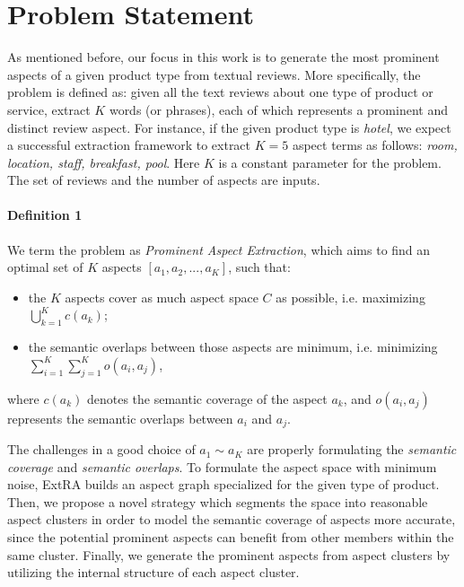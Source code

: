 \section{Problem Statement}
\label{sec:problem}
As mentioned before, our focus in this work is to
generate the most prominent aspects of a given product type
from textual reviews.
More specifically, the problem is defined as:
given all the text reviews about
one type of product or service, extract $K$ words (or phrases),
each of which represents a prominent and distinct review aspect.
For instance, if the given product type is \textit{hotel}, 
we expect a successful extraction framework to extract 
$K=5$ aspect terms as follows: 
\textit{room, location, staff, breakfast, pool}.
Here $K$ is a constant parameter for the problem. 
The set of reviews and the number of aspects are inputs.


\paragraph{Definition 1}
We term the problem as \textit{Prominent Aspect Extraction},
which aims to find 
an optimal set of $K$ aspects $[a_1, a_2, ..., a_K]$, such that:
\begin{itemize}
	\item  the $K$ aspects cover as much aspect space $C$ as possible,
	i.e. maximizing $\bigcup_{k=1}^K c(a_k)$;
	\item the semantic overlaps between those aspects are minimum, 
	i.e. minimizing $\sum_{i=1}^{K}\sum_{j=1}^{K}o(a_i, a_j)$,
\end{itemize}
where $c(a_k)$ denotes the semantic coverage of the aspect $a_k$,
and $o(a_i, a_j)$ represents the semantic overlaps between 
$a_i$ and $a_j$.

The challenges in a good choice of $a_1\sim a_K$ are properly
formulating the \textit{semantic coverage} and \textit{semantic overlaps}.
To formulate the aspect space with minimum noise, 
ExtRA builds an aspect graph specialized for the given type of product.
Then, we propose a novel strategy which segments the space into reasonable aspect clusters in order to model the semantic coverage of
aspects more accurate, since the potential prominent aspects can benefit from other members within the same cluster.
Finally, we generate the prominent aspects from aspect clusters
by utilizing the internal structure of each aspect cluster.

